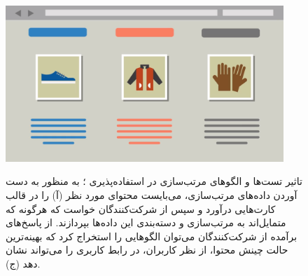 \begin{figure}[H]
{		\includegraphics[width=10.5cm]{Resources/sort3.PNG}
	}
	\caption[تاثیر تست‌ها و الگوهای مرتب‌سازی در استفاده‌پذیری]
	{تاثیر تست‌ها و الگوهای مرتب‌سازی در استفاده‌پذیری
		\cite{noauthor_card_nodate}؛
		به منظور به دست آوردن داده‌های مرتب‌سازی، می‌بایست محتوای مورد نظر (آ) را در قالب کارت‌هایی درآورد  و سپس از شرکت‌کنندگان خواست که هرگونه که متمایل‌اند به مرتب‌سازی و دسته‌بندی این داده‌ها بپردازند. از پاسخ‌های برآمده از شرکت‌کنندگان می‌توان الگوهایی را استخراج کرد که بهینه‌ترین حالت چینش محتوا، از نظر کاربران، در رابط کاربری را می‌تواند نشان دهد (ج).
	}
	\label{fig:sorting}
\end{figure}
